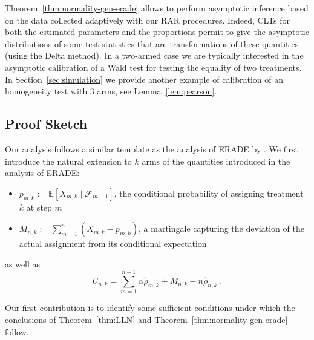 \documentclass[11pt]{article}
\theoremstyle{plain}
\theoremstyle{definition}
\begin{document}
Theorem~\ref{thm:normality-gen-erade} allows to perform asymptotic inference based on the data collected adaptively with our RAR procedures. Indeed, CLTs for both the estimated parameters and the proportions permit to give the asymptotic distributions of some test statistics that are transformations of these quantities (using the Delta method). In a two-armed case we are typically interested in the asymptotic calibration of a Wald test for testing the equality of two treatments. In Section~\ref{sec:simulation} we provide another example of calibration of an homogeneity test with 3 arms, see Lemma~\ref{lem:pearson}.


\subsection{Proof Sketch}\label{sec:rts-proof}
Our analysis follows a similar template as the analysis of ERADE by \cite{hu2009efficient}. We first introduce the natural extension to $k$ arms of the quantities introduced in the analysis of ERADE:
	\begin{itemize}
		\item $p_{m,k} := \mathbb{E}[X_{m,k} \mid \mathcal{F}_{m-1}]$, the conditional probability of assigning treatment $k$ at step $m$
		\item $M_{n,k} := \sum_{m=1}^{n}(X_{m,k} - p_{m,k})$, a martingale capturing the deviation of the actual assignment from its conditional expectation
	\end{itemize}
as well as
\[U_{n,k} = \sum_{m=1}^{n-1} \alpha \hat{\rho}_{m,k} + M_{n,k} - n \hat{\rho}_{n,k}\;.\]

Our first contribution is to identify some sufficient conditions under which the conclusions of Theorem~\ref{thm:LLN} and Theorem~\ref{thm:normality-gen-erade} follow.
\end{document}
